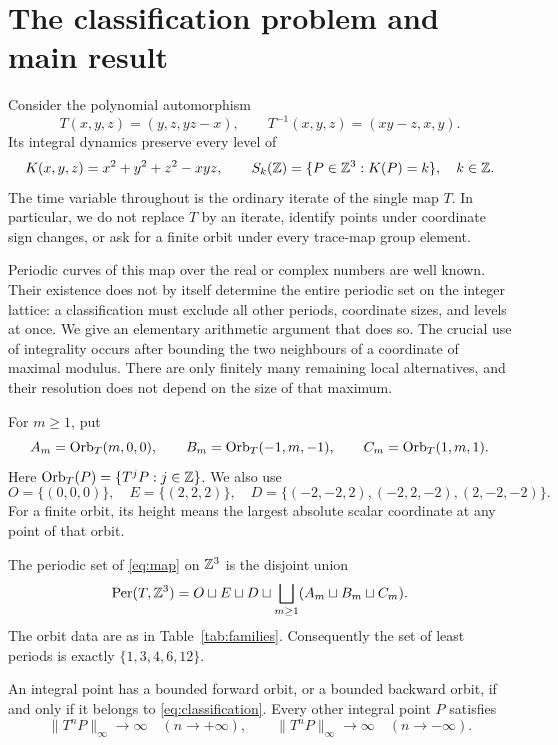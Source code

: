 \section{The classification problem and main result}
\label{sec:intro}

Consider the polynomial automorphism
\begin{equation}\label{eq:map}
 T(x,y,z)=(y,z,yz-x),\qquad
 T^{-1}(x,y,z)=(xy-z,x,y).
\end{equation}
Its integral dynamics preserve every level of
\begin{equation}\label{eq:invariant}
 K(x,y,z)=x^2+y^2+z^2-xyz,\qquad
 S_k(\mathbb Z)=\{P\in\mathbb Z^3:K(P)=k\},\quad k\in\mathbb Z.
\end{equation}
The time variable throughout is the ordinary iterate of the single map
$T$. In particular, we do not replace $T$ by an iterate, identify points
under coordinate sign changes, or ask for a finite orbit under every
trace-map group element.

Periodic curves of this map over the real or complex numbers are well
known. Their existence does not by itself determine the entire periodic
set on the integer lattice: a classification must exclude all other
periods, coordinate sizes, and levels at once. We give an elementary
arithmetic argument that does so. The crucial use of integrality occurs
after bounding the two neighbours of a coordinate of maximal modulus.
There are only finitely many remaining local alternatives, and their
resolution does not depend on the size of that maximum.

For $m\geq1$, put
\begin{equation}\label{eq:families}
 A_m=\operatorname{Orb}_T(m,0,0),\qquad
 B_m=\operatorname{Orb}_T(-1,m,-1),\qquad
 C_m=\operatorname{Orb}_T(1,m,1).
\end{equation}
Here $\operatorname{Orb}_T(P)=\{T^jP:j\in\mathbb Z\}$. We also use
\begin{equation}\label{eq:special}
 O=\{(0,0,0)\},\quad E=\{(2,2,2)\},\quad
 D=\{(-2,-2,2),(-2,2,-2),(2,-2,-2)\}.
\end{equation}
For a finite orbit, its height means the largest absolute scalar
coordinate at any point of that orbit.

\begin{theorem}\label{thm:main}
The periodic set of \eqref{eq:map} on $\mathbb Z^3$ is the disjoint union
\begin{equation}\label{eq:classification}
 \operatorname{Per}(T,\mathbb Z^3)=O\sqcup E\sqcup D\sqcup
 \bigsqcup_{m\geq1}(A_m\sqcup B_m\sqcup C_m).
\end{equation}
The orbit data are as in Table~\ref{tab:families}. Consequently the set
of least periods is exactly $\{1,3,4,6,12\}$.

An integral point has a bounded forward orbit, or a bounded backward
orbit, if and only if it belongs to \eqref{eq:classification}. Every
other integral point $P$ satisfies
\begin{equation}\label{eq:escape}
 \|T^nP\|_\infty\longrightarrow\infty
 \quad(n\to+\infty),\qquad
 \|T^nP\|_\infty\longrightarrow\infty
 \quad(n\to-\infty).
\end{equation}
\end{theorem}

